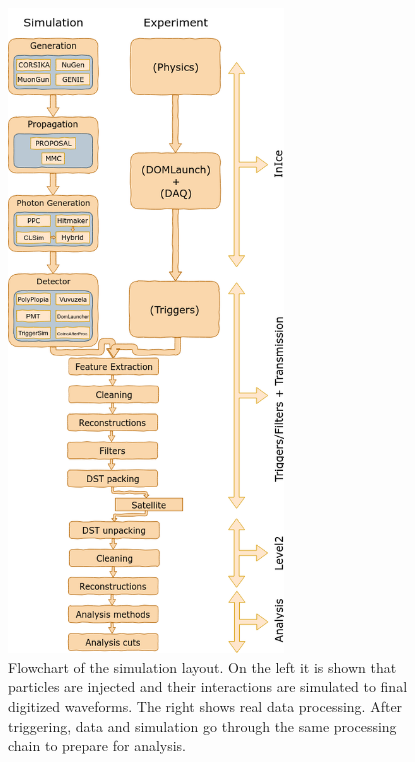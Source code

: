 \begin{figure}
\centering
\includegraphics[width=0.65\textwidth]{chapter6/img/flowchart_extended.png}
\caption{Flowchart of the simulation layout. On the left it is shown that particles are injected and their interactions are simulated to final digitized waveforms. The right shows real data processing. After triggering, data and simulation go through the same processing chain to prepare for analysis.}
\label{fig:flowchart}
\end{figure}

